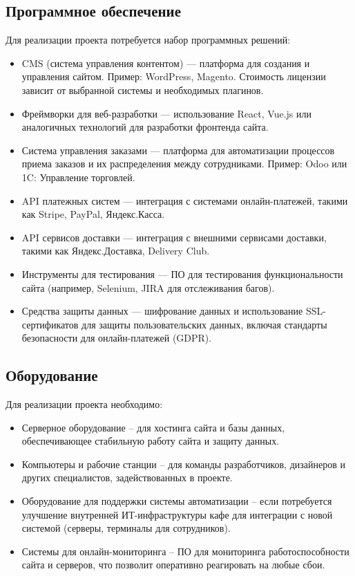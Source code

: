 \subsection{Программное обеспечение}

Для реализации проекта потребуется набор программных решений:

\begin{itemize}
	\item CMS (система управления контентом) --- платформа для создания и управления сайтом. Пример: WordPress, Magento. Стоимость лицензии зависит от выбранной системы и необходимых плагинов.
	\item Фреймворки для веб-разработки --- использование React, Vue.js или аналогичных технологий для разработки фронтенда сайта.
	\item Система управления заказами --- платформа для автоматизации процессов приема заказов и их распределения между сотрудниками. Пример: Odoo или 1C: Управление торговлей.
	\item API платежных систем --- интеграция с системами онлайн-платежей, такими как Stripe, PayPal, Яндекс.Касса.
	\item API сервисов доставки --- интеграция с внешними сервисами доставки, такими как Яндекс.Доставка, Delivery Club.
	\item Инструменты для тестирования --- ПО для тестирования функциональности сайта (например, Selenium, JIRA для отслеживания багов).
	\item Средства защиты данных --- шифрование данных и использование SSL-сертификатов для защиты пользовательских данных, включая стандарты безопасности для онлайн-платежей (GDPR).
\end{itemize}

\subsection{Оборудование}

Для реализации проекта необходимо:

\begin{itemize}
	\item Серверное оборудование – для хостинга сайта и базы данных, обеспечивающее стабильную работу сайта и защиту данных.
	\item Компьютеры и рабочие станции – для команды разработчиков, дизайнеров и других специалистов, задействованных в проекте.
	\item Оборудование для поддержки системы автоматизации – если потребуется улучшение внутренней ИТ-инфраструктуры кафе для интеграции с новой системой (серверы, терминалы для сотрудников).
	\item Системы для онлайн-мониторинга – ПО для мониторинга работоспособности сайта и серверов, что позволит оперативно реагировать на любые сбои.
\end{itemize}

